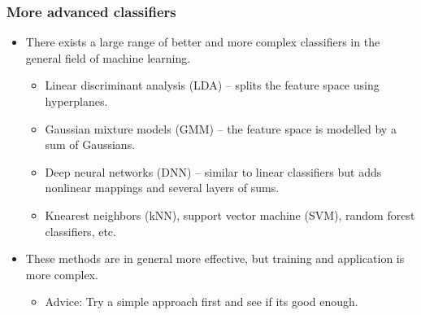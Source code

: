 \documentclass[letterpaper,10pt,english]{jupyterBook}
\begin{document}
\subsubsection{More advanced classifiers}
\label{\detokenize{Recognition/Voice_activity_detection:more-advanced-classifiers}}\begin{itemize}
\item {} 
\sphinxAtStartPar
There exists a large range of better and more complex classifiers in
the general field of machine learning.
\begin{itemize}
\item {} 
\sphinxAtStartPar
Linear discriminant analysis (LDA) – splits the feature space
using hyper\sphinxhyphen{}planes.

\item {} 
\sphinxAtStartPar
Gaussian mixture models (GMM) – the feature space is modelled
by a sum of Gaussians.

\item {} 
\sphinxAtStartPar
Deep neural networks (DNN) – similar to linear classifiers but adds
non\sphinxhyphen{}linear mappings and several layers of sums.

\item {} 
\sphinxAtStartPar
K\sphinxhyphen{}nearest neighbors (kNN), support vector machine (SVM), random
forest classifiers, etc.

\end{itemize}

\item {} 
\sphinxAtStartPar
These methods are in general more effective, but training and
application is more complex.
\begin{itemize}
\item {} 
\sphinxAtStartPar
Advice: Try a simple approach first and see if its good enough.

\end{itemize}

\end{itemize}
\end{document}
